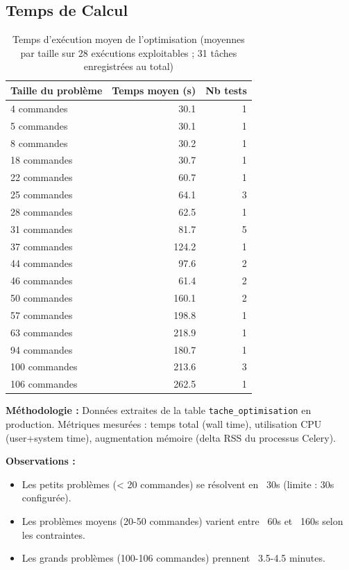 \documentclass[12pt,a4paper]{report}
\begin{document}
\subsection{Temps de Calcul}

\begin{table}[H]
\centering
\begin{tabular}{lrr}
\toprule
\textbf{Taille du problème} & \textbf{Temps moyen (s)} & \textbf{Nb tests} \\
\midrule
4 commandes     & 30.1  & 1 \\
5 commandes     & 30.1  & 1 \\
8 commandes     & 30.2  & 1 \\
18 commandes    & 30.7  & 1 \\
22 commandes    & 60.7  & 1 \\
25 commandes    & 64.1  & 3 \\
28 commandes    & 62.5  & 1 \\
31 commandes    & 81.7  & 5 \\
37 commandes    & 124.2 & 1 \\
44 commandes    & 97.6  & 2 \\
46 commandes    & 61.4  & 2 \\
50 commandes    & 160.1 & 2 \\
57 commandes    & 198.8 & 1 \\
63 commandes    & 218.9 & 1 \\
94 commandes    & 180.7 & 1 \\
100 commandes   & 213.6 & 3 \\
106 commandes   & 262.5 & 1 \\
\bottomrule
\end{tabular}
\caption{Temps d'exécution moyen de l'optimisation (moyennes par taille sur 28 exécutions exploitables ; 31 tâches enregistrées au total)}
\label{tab:perf-temps}
\end{table}

\textbf{Méthodologie :} Données extraites de la table \texttt{tache\_optimisation} en production. Métriques mesurées : temps total (wall time), utilisation CPU (user+system time), augmentation mémoire (delta RSS du processus Celery).

\textbf{Observations :}
\begin{itemize}[leftmargin=2.2em]
    \item Les petits problèmes (< 20 commandes) se résolvent en ~30s (limite : 30s configurée).
    \item Les problèmes moyens (20-50 commandes) varient entre ~60s et ~160s selon les contraintes.
    \item Les grands problèmes (100-106 commandes) prennent ~3.5-4.5 minutes.
\end{itemize}
\end{document}
